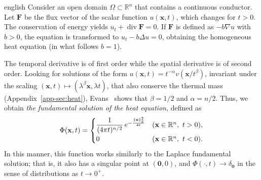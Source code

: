 \begin{hyphenrules}{english}
Consider an open domain $\Omega\subset\mathbb{R}^n$ that contains a continuous conductor. Let $\mathbf{F}$ be the flux
vector of the scalar function $u(\mathbf{x},t)$, which changes for $t>0$. The conservation of energy yields
$u_t+\operatorname{div}\mathbf{F}=0$. If $\mathbf{F}$ is defined as $-b\nabla u$ with $b>0$, the equation is transformed
to $u_t-b\Delta u=0$, obtaining the homogeneous heat equation (in what follows $b=1$).

The temporal derivative is of first order while the spatial derivative is of second order. Looking for
solutions of the form $u(\mathbf{x},t)=t^{-\alpha}v(\mathbf{x}/t^{\beta})$, invariant under the scaling
$(\mathbf{x},t)\mapsto(\lambda^{\beta}\mathbf{x},\lambda t)$, that also conserve the thermal mass
(Appendix~\ref{app-sec:heat}), Evans~\cite{evans2010} shows that $\beta=1/2$ and $\alpha=n/2$. Thus, we obtain
\emph{the fundamental solution of the heat equation}, defined as
\begin{equation}
  \Phi(\mathbf{x},t)=
  \begin{cases}
    \dfrac{1}{(4\pi t)^{n/2}}\,e^{-\frac{\left\lVert \mathbf{x} \right\rVert_2^2}{4t}} & (\mathbf{x}\in\mathbb{R}^n,\ t>0),\\[2mm]
    0 & (\mathbf{x}\in\mathbb{R}^n,\ t<0).
  \end{cases}
  \label{eq:heat-fundamental}
\end{equation}
In this manner, this function works similarly to the Laplace fundamental solution; that is, it also has
a singular point at $(\mathbf{0},0)$, and $\Phi(\cdot,t)\to\delta_{\mathbf{0}}$ in the sense of
distributions as $t\to0^+$.


\end{hyphenrules}
